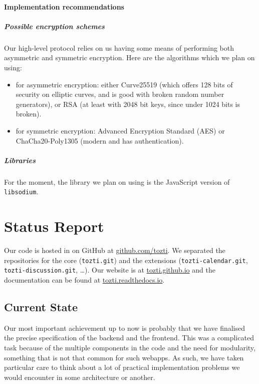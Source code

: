\documentclass[a4paper, english]{report}
\begin{document}
\subsubsection{Implementation recommendations}
\paragraph{Possible encryption schemes}
  Our high-level protocol relies on us having some means of performing both asymmetric and symmetric encryption. Here are the algorithms which we plan on using:
\begin{itemize}
\item for asymmetric encryption: either Curve25519 (which offers 128 bits of security on elliptic curves, and is good with broken random number generators), or RSA (at least with 2048 bit keys, since under 1024 bits is broken).
\item for symmetric encryption: Advanced Encryption Standard (AES) or ChaCha20-Poly1305 (modern and has authentication).
\end{itemize}
\paragraph{Libraries}
For the moment, the library we plan on using is the JavaScript version of \texttt{libsodium}.

\chapter{Status Report}
Our code is hosted in on GitHub at \url{github.com/tozti}. We separated the repositories for the core (\texttt{tozti.git}) and the extensions (\texttt{tozti-calendar.git}, \texttt{tozti-discussion.git}, \dots). Our website is at \url{tozti.github.io} and the documentation can be found at \url{tozti.readthedocs.io}.

\section{Current State}
Our most important achievement up to now is probably that we have finalised the precise specification of the backend and the frontend. This was a complicated task because of the multiple components in the code and the need for modularity, something that is not that common for such webapps. As such, we have taken particular care to think about a lot of practical implementation problems we would encounter in some architecture or another.
\end{document}
